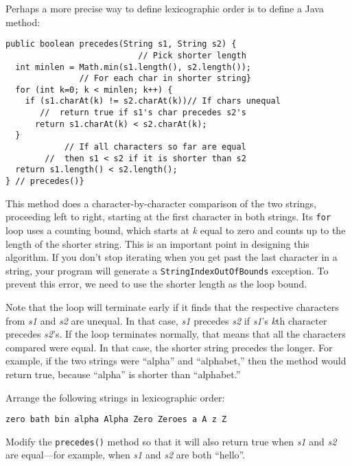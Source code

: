 \noindent Perhaps a more precise way to define lexicographic
order is to define a Java method:

\begin{jjjlisting}
\begin{lstlisting}
public boolean precedes(String s1, String s2) {
                           // Pick shorter length
  int minlen = Math.min(s1.length(), s2.length()); 
               // For each char in shorter string}
  for (int k=0; k < minlen; k++) { 
    if (s1.charAt(k) != s2.charAt(k))// If chars unequal
       //  return true if s1's char precedes s2's
      return s1.charAt(k) < s2.charAt(k); 
  }
            // If all characters so far are equal
        //  then s1 < s2 if it is shorter than s2
  return s1.length() < s2.length();  
} // precedes()}  
\end{lstlisting}
\end{jjjlisting}

\noindent This method does a character-by-character comparison of
 the two strings, proceeding left to
right, starting at the first character in both strings.  Its {\tt for}
loop uses a counting bound, which starts at {\it k} equal to zero and
counts up to the length of the shorter string.  This is an important
point in designing this algorithm.  If you don't stop iterating when
you get past the last character in a string, your program will
generate a {\tt StringIndexOutOfBounds} exception.  To prevent this
error, we need to use the shorter length as the loop bound.

Note that the loop will terminate early if it finds that the
respective characters from {\it s1} and {\it s2} are unequal.  In that
case, {\it s1} precedes {\it s2} if {\it s1}'s {\it k}th character
precedes {\it s2}'s.  If the loop terminates normally, that means that
all the characters compared were equal.  In that case, the shorter
string precedes the longer.  For example, if the two strings were
``alpha'' and ``alphabet,'' then the method would return true, because
``alpha'' is shorter than ``alphabet.''

\begin{SSTUDY}
\item  Arrange the following strings in lexicographic order:

\begin{jjjlisting}
\begin{lstlisting}
zero bath bin alpha Alpha Zero Zeroes a A z Z
\end{lstlisting}
\end{jjjlisting}


\item  Modify the {\tt precedes()} method so that it will also return true
when {\it s1} and {\it s2} are equal---for example, when
{\it s1} and {\it s2} are both ``hello''.

\end{SSTUDY}


